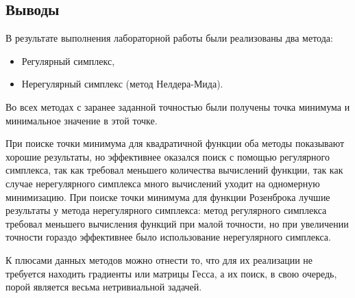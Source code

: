 \documentclass[12pt, a4paper]{article}
\begin{document}
\begin{figure}[!h]
	\begin{minipage}[h]{140pt}
	\end{minipage}
	\hfill
	\begin{minipage}[h]{140pt}
	\end{minipage}
\hfill
\begin{minipage}[h]{140pt}
\end{minipage}
	\vfill
	$\,$
	\centering{ }
	\caption{}
\end{figure}


\clearpage
\subsection {Выводы}

В результате выполнения лабораторной работы были реализованы два метода:
\begin{itemize}
	\item Регулярный симплекс,
	\item Нерегулярный симплекс (метод Нелдера-Мида).
\end{itemize}

Во всех методах с заранее заданной точностью были получены точка минимума и минимальное значение в этой точке. 

При поиске точки минимума для квадратичной функции оба методы показывают хорошие результаты, но эффективнее оказался поиск с помощью регулярного симплекса, так как требовал меньшего количества вычислений функции, так как случае нерегулярного симплекса много вычислений уходит на одномерную минимизацию.
При поиске точки минимума для функции Розенброка лучшие результаты у
метода нерегулярного симплекса: метод регулярного симплекса требовал меньшего вычисления функций при малой точности, но при увеличении точности гораздо эффективнее было использование нерегулярного симплекса. 

 К плюсами данных методов можно отнести то, что для их реализации не требуется находить градиенты или матрицы Гесса, а их поиск, в свою очередь, порой является весьма нетривиальной задачей. 
\end{document}

